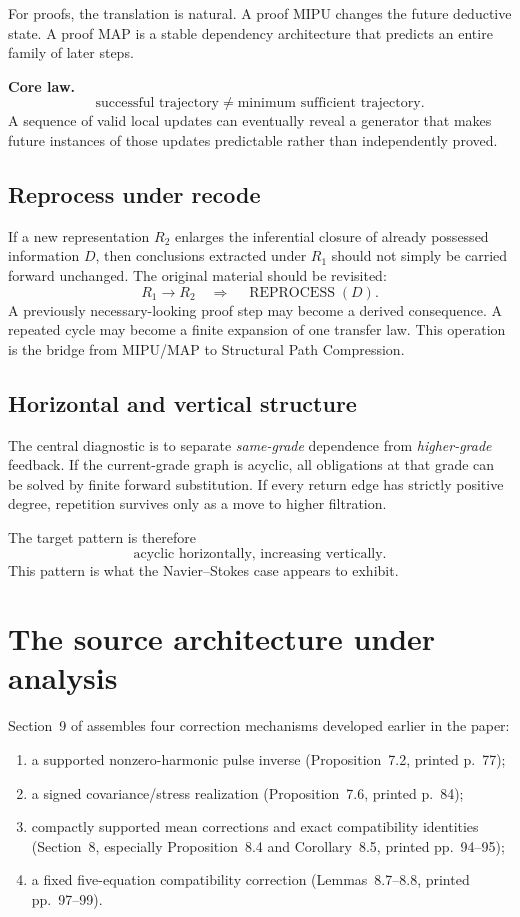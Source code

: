\documentclass[11pt]{article}
\numberwithin{equation}{section}
\theoremstyle{highend}
\theoremstyle{definition}
\newcommand{\REPROCESS}{\operatorname{REPROCESS}}
\begin{document}
For proofs, the translation is natural. A proof MIPU changes the future deductive state. A proof MAP is a stable dependency architecture that predicts an entire family of later steps.

\begin{keybox}
\textbf{Core law.}
\[
\text{successful trajectory}\neq\text{minimum sufficient trajectory}.
\]
A sequence of valid local updates can eventually reveal a generator that makes future instances of those updates predictable rather than independently proved.
\end{keybox}

\subsection{Reprocess under recode}
If a new representation $R_2$ enlarges the inferential closure of already possessed information $D$, then conclusions extracted under $R_1$ should not simply be carried forward unchanged. The original material should be revisited:
\[
R_1\to R_2
\quad\Longrightarrow\quad
\REPROCESS(D).
\]
A previously necessary-looking proof step may become a derived consequence. A repeated cycle may become a finite expansion of one transfer law. This operation is the bridge from MIPU/MAP to Structural Path Compression.

\subsection{Horizontal and vertical structure}
The central diagnostic is to separate \emph{same-grade} dependence from \emph{higher-grade} feedback. If the current-grade graph is acyclic, all obligations at that grade can be solved by finite forward substitution. If every return edge has strictly positive degree, repetition survives only as a move to higher filtration.

The target pattern is therefore
\[
\boxed{\text{acyclic horizontally, increasing vertically}.}
\]
This pattern is what the Navier--Stokes case appears to exhibit.

\section{The source architecture under analysis}
Section~9 of \cite{OpenAI2026NS} assembles four correction mechanisms developed earlier in the paper:
\begin{enumerate}
  \item a supported nonzero-harmonic pulse inverse (Proposition~7.2, printed p.~77);
  \item a signed covariance/stress realization (Proposition~7.6, printed p.~84);
  \item compactly supported mean corrections and exact compatibility identities (Section~8, especially Proposition~8.4 and Corollary~8.5, printed pp.~94--95);
  \item a fixed five-equation compatibility correction (Lemmas~8.7--8.8, printed pp.~97--99).
\end{enumerate}
\end{document}
